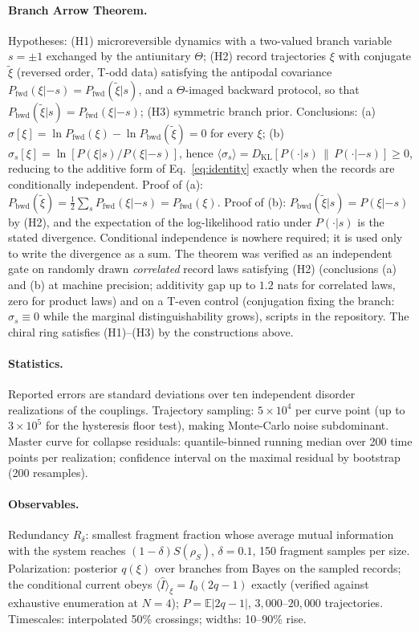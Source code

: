 \documentclass[11pt]{article}
\newcommand{\Iop}{\hat{I}}
\begin{document}
\paragraph{Branch Arrow Theorem.}
Hypotheses: (H1) microreversible dynamics with a two-valued branch variable $s = \pm 1$ exchanged by the antiunitary $\Theta$; (H2) record trajectories $\xi$ with conjugate $\tilde\xi$ (reversed order, T-odd data) satisfying the antipodal covariance $P_{\mathrm{fwd}}(\xi|{-s}) = P_{\mathrm{fwd}}(\tilde\xi|s)$, and a $\Theta$-imaged backward protocol, so that $P_{\mathrm{bwd}}(\tilde\xi|s) = P_{\mathrm{fwd}}(\xi|{-s})$; (H3) symmetric branch prior. Conclusions: (a) $\sigma[\xi] = \ln P_{\mathrm{fwd}}(\xi) - \ln P_{\mathrm{bwd}}(\tilde\xi) = 0$ for every $\xi$; (b) $\sigma_s[\xi] = \ln[P(\xi|s)/P(\xi|{-s})]$, hence $\langle\sigma_s\rangle = D_{\mathrm{KL}}[P(\cdot|s)\,\|\,P(\cdot|{-s})] \ge 0$, reducing to the additive form of Eq.~\eqref{eq:identity} exactly when the records are conditionally independent. Proof of (a): $P_{\mathrm{bwd}}(\tilde\xi) = \tfrac12\sum_s P_{\mathrm{fwd}}(\xi|{-s}) = P_{\mathrm{fwd}}(\xi)$. Proof of (b): $P_{\mathrm{bwd}}(\tilde\xi|s) = P(\xi|{-s})$ by (H2), and the expectation of the log-likelihood ratio under $P(\cdot|s)$ is the stated divergence. Conditional independence is nowhere required; it is used only to write the divergence as a sum. The theorem was verified as an independent gate on randomly drawn \emph{correlated} record laws satisfying (H2) (conclusions (a) and (b) at machine precision; additivity gap up to $1.2$ nats for correlated laws, zero for product laws) and on a T-even control (conjugation fixing the branch: $\sigma_s \equiv 0$ while the marginal distinguishability grows), scripts in the repository. The chiral ring satisfies (H1)--(H3) by the constructions above.

\paragraph{Statistics.}
Reported errors are standard deviations over ten independent disorder realizations of the couplings. Trajectory sampling: $5\times10^4$ per curve point (up to $3\times10^5$ for the hysteresis floor test), making Monte-Carlo noise subdominant. Master curve for collapse residuals: quantile-binned running median over 200 time points per realization; confidence interval on the maximal residual by bootstrap (200 resamples).

\paragraph{Observables.}
Redundancy $R_\delta$: smallest fragment fraction whose average mutual information with the system reaches $(1-\delta)S(\rho_S)$, $\delta=0.1$, 150 fragment samples per size. Polarization: posterior $q(\xi)$ over branches from Bayes on the sampled records; the conditional current obeys $\langle\Iop\rangle_\xi=I_0(2q-1)$ exactly (verified against exhaustive enumeration at $N=4$); $P=\mathbb E|2q-1|$, $3{,}000$--$20{,}000$ trajectories. Timescales: interpolated 50\% crossings; widths: 10--90\% rise.
\end{document}
